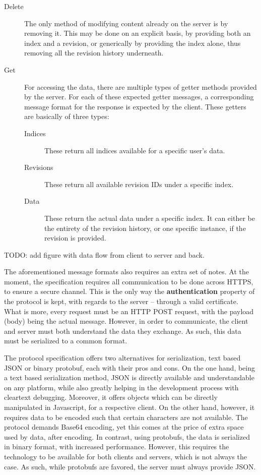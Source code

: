 \begin{description}
\begin{description}
    \item[Delete] The only method of modifying content already on the server is by removing it.
    This may be done on an explicit basis, by providing both an index and a revision, or generically by providing the index alone, thus removing all the revision history underneath.

    \item[Get] For accessing the data, there are multiple types of getter methods provided by the server.
    For each of these expected getter messages, a corresponding message format for the response is expected by the client.
    These getters are basically of three types:
    \begin{description}
      \item[Indices] These return all indices available for a specific user's data.
      \item[Revisions] These return all available revision IDs under a specific index.
      \item[Data] These return the actual data under a specific index.
      It can either be the entirety of the revision history, or one specific instance, if the revision is provided.
    \end{description}
  \end{description}
\end{description}

TODO: add figure with data flow from client to server and back.

The aforementioned message formats also requires an extra set of notes.
At the moment, the specification requires all communication to be done across HTTPS, to ensure a secure channel.
This is the only way the \textbf{authentication} property of the protocol is kept, with regards to the server -- through a valid certificate.
What is more, every request must be an HTTP POST request, with the payload (body) being the actual message.
However, in order to communicate, the client and server must both understand the data they exchange.
As such, this data must be serialized to a common format.

The protocol specification offers two alternatives for serialization, text based JSON or binary protobuf, each with their pros and cons.
On the one hand, being a text based serialization method, JSON is directly available and understandable on any platform, while also greatly helping in the development process with cleartext debugging.
Moreover, it offers objects which can be directly manipulated in Javascript, for a respective client.
On the other hand, however, it requires data to be encoded such that certain characters are not available.
The protocol demands Base64 encoding, yet this comes at the price of extra space used by data, after encoding.
In contrast, using protobufs, the data is serialized in binary format, with increased performance.
However, this requires the technology to be available for both clients and servers, which is not always the case.
As such, while protobufs are favored, the server must always provide JSON.

